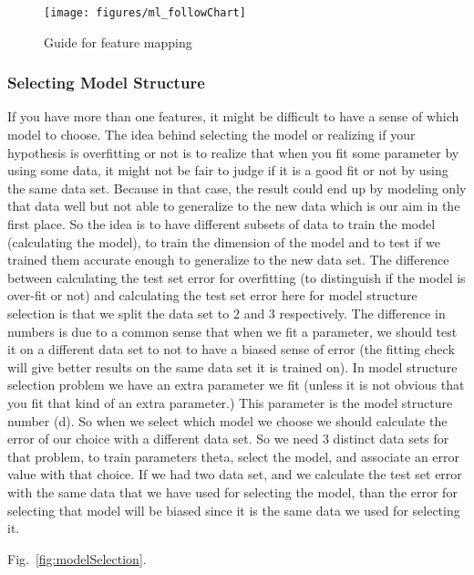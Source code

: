 \begin{figure}
\begin{center}
\texttt{[image: figures/ml\_followChart]}    %
\caption{Guide for feature mapping} 
\label{fig:ml_followChart}
\end{center}
\end{figure}

\subsubsection{Selecting Model Structure}

If you have more than one features, it might be difficult 
to have a sense of which model to choose. The idea 
behind selecting the model or realizing if your hypothesis 
is overfitting or not is to realize that when you fit some 
parameter by using some data, it might not be fair to 
judge if it is a good fit or not by using the same data set.   
Because in that case, the result could end up by modeling 
only that data well but not able to generalize to the new 
data which is our aim in the first place. So the idea is to 
have different subsets of data to train the model (calculating 
the model), to train the dimension of the model and to test if 
we trained them accurate enough to generalize to the new data set. 
The difference between calculating the test set error for 
overfitting (to distinguish if the model is over-fit or not) and 
calculating the test set error here for model structure 
selection is that we split the data set to 2 and 3 respectively. 
The difference in numbers is due to a common sense that 
when we fit a parameter, we should test it on a different data 
set to not to have a biased sense of error (the fitting check 
will give better results on the same data set it is trained on). 
In model structure selection problem we have an extra 
parameter we fit (unless it is not obvious that you fit that 
kind of an extra parameter.) This parameter is the model 
structure number (d). So when we select which model we 
choose we should calculate the error of our choice with a 
different data set. So we need 3 distinct data sets for that 
problem, to train parameters theta, select the model, and 
associate an error value with that choice. If we had two 
data set, and we calculate the test set error with the same 
data that we have used for selecting the model, than the 
error for selecting that model will be biased since it is the 
same data we used for selecting it. 

Fig.~\ref{fig:modelSelection}. 



